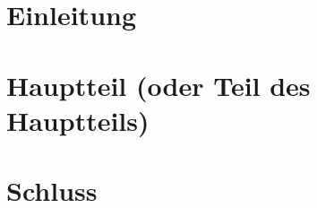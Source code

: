 \documentclass[a4paper, 12pt]{article}
\begin{document}

\pagestyle{fancy}
\thispagestyle{empty}



\newpage

\newpage

\newpage

\tableofcontents	

\newpage
{}
\setcounter{page}{6} %

\section{Einleitung}


\section{Hauptteil (oder Teil des Hauptteils)}


\section{Schluss}


\newpage

\end{document}
